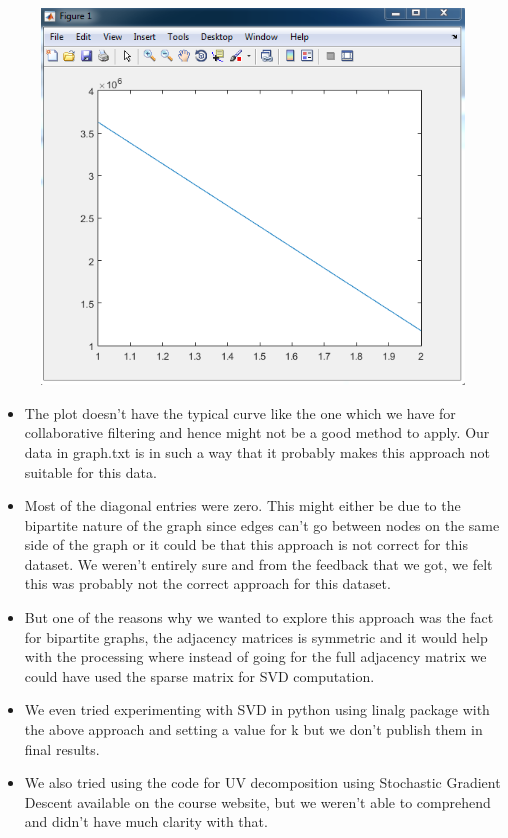 \documentclass[letterpaper,twocolumn,11pt]{article}
\begin{document}
\begin{figure}[H]
\begin{center}
\includegraphics[width=1\linewidth]{images/SVD_output.png}
\label{fig:status}
\end{center}
\end{figure}

\begin{itemize}
\item The plot doesn't have the typical curve like the one which we have for collaborative filtering and hence might not be a good method to apply. Our data in graph.txt is in such a way that it probably makes this approach not suitable for this data.

\item Most of the diagonal entries were zero. This might either be due to the bipartite nature of the graph since edges can't go between nodes on the same side of the graph or it could be that this approach is not correct for this dataset. We weren't entirely sure and from the feedback that we got, we felt this was probably not the correct approach for this dataset.
 
\item But one of the reasons why we wanted to explore this approach was the fact for bipartite graphs, the adjacency matrices is symmetric and it would help with the processing where instead of going for the full adjacency matrix we could have used the sparse matrix for SVD computation.

\item We even tried experimenting with SVD in python using linalg package with the above approach and setting a value for k but we don't publish them in final results.

\item We also tried using the code for UV decomposition using Stochastic Gradient Descent available on the course website, but we weren't able to comprehend and didn't have much clarity with that.
\end{itemize}
\end{document}
